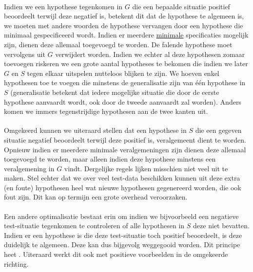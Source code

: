 \paragraph{}
Indien we een hypothese tegenkomen in $G$ die een bepaalde situatie positief beoordeelt terwijl deze negatief is, betekent dit dat de hypothese te algemeen is, we moeten met andere woorden de hypothese vervangen door een hypothese die minimaal gespecificeerd wordt. Indien er meerdere \underline{minimale} specificaties mogelijk zijn, dienen deze allemaal toegevoegd te worden. De falende hypothese moet vervolgens uit $G$ verwijdert worden. Indien we echter al deze hypothesen zomaar toevoegen riskeren we een grote aantal hypotheses te bekomen die indien we later $G$ en $S$ tegen elkaar uitspelen nutteloos blijken te zijn. We hoeven enkel hypothesen toe te voegen die minstens de generalisatie zijn van \'e\'en hypothese in $S$ (generalisatie betekent dat iedere mogelijke situatie die door de eerste hypothese aanvaardt wordt, ook door de tweede aanvaardt zal worden). Anders komen we immers tegenstrijdige hypothesen aan de twee kanten uit.
\paragraph{}
Omgekeerd kunnen we uiteraard stellen dat een hypothese in $S$ die een gegeven situatie negatief beoordeelt terwijl deze positief is, veralgemeent dient te worden. Opnieuw indien er meerdere minimale veralgemeningen zijn dienen deze allemaal toegevoegd te worden, maar alleen indien deze hypothese minstens een veralgemening in $G$ vindt. Dergelijke regels lijken misschien niet veel uit te maken. Stel echter dat we over veel test-data beschikken kunnen uit deze extra (en foute) hypothesen heel wat nieuwe hypothesen gegenereerd worden, die ook fout zijn. Dit kan op termijn een grote overhead veroorzaken.
\paragraph{}
Een andere optimalisatie bestaat erin om indien we bijvoorbeeld een negatieve test-situatie tegenkomen te controleren of alle hypothesen in $S$ deze niet bevatten. Indien er een hypothese is die deze test-situatie toch positief beoordeelt, is deze duidelijk te algemeen. Deze kan dus bijgevolg weggegooid worden. Dit principe heet . Uiteraard werkt dit ook met positieve voorbeelden in de omgekeerde richting.
